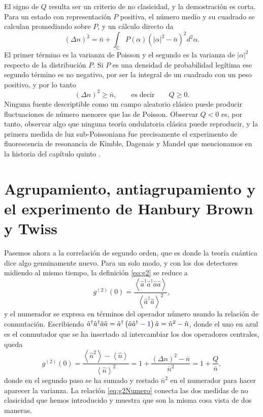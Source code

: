     El signo de $Q$ resulta ser un criterio de no clasicidad, y la demostración es corta. Para un estado con representación $P$ positiva, el número medio y su cuadrado se calculan promediando sobre $P$, y un cálculo directo da
    \begin{equation}\label{eq:VarianzaConP}
        \left(\Delta n\right)^{2} = \bar{n} + \int_{\mathbb{C}} P(\alpha)\left(|\alpha|^{2} - \bar{n}\right)^{2}d^{2}\alpha .
    \end{equation}
    El primer término es la varianza de Poisson y el segundo es la varianza de $|\alpha|^{2}$ respecto de la distribución $P$. Si $P$ es una densidad de probabilidad legítima ese segundo término es no negativo, por ser la integral de un cuadrado con un peso positivo, y por lo tanto
    \begin{equation}\label{eq:CotaClasicaQ}
        \left(\Delta n\right)^{2} \geq \bar{n},
        \qquad\text{es decir}\qquad
        Q \geq 0 .
    \end{equation}
    Ninguna fuente descriptible como un campo aleatorio clásico puede producir fluctuaciones de número menores que las de Poisson. Observar $Q<0$ es, por tanto, observar algo que ninguna teoría ondulatoria clásica puede reproducir, y la primera medida de luz sub-Poissoniana fue precisamente el experimento de fluorescencia de resonancia de Kimble, Dagenais y Mandel que mencionamos en la historia del capítulo quinto \citep{kimble1977photon}.

\section{Agrupamiento, antiagrupamiento y el experimento de Hanbury Brown y Twiss}

    Pasemos ahora a la correlación de segundo orden, que es donde la teoría cuántica dice algo genuinamente nuevo. Para un solo modo, y con los dos detectores midiendo al mismo tiempo, la definición \eqref{eq:g2} se reduce a
    \begin{equation}\label{eq:g2UnModo}
        g^{(2)}(0) = \frac{\left\langle \hat{a}^{\dagger}\hat{a}^{\dagger}\hat{a}\hat{a}\right\rangle}{\left\langle \hat{a}^{\dagger}\hat{a}\right\rangle^{2}},
    \end{equation}
    y el numerador se expresa en términos del operador número usando la relación de conmutación. Escribiendo $\hat{a}^{\dagger}\hat{a}^{\dagger}\hat{a}\hat{a} = \hat{a}^{\dagger}\left(\hat{a}\hat{a}^{\dagger}-\textcolor{blue}{1}\right)\hat{a} = \hat{n}^{2}-\hat{n}$, donde el uno en azul es el conmutador que se ha insertado al intercambiar los dos operadores centrales, queda
    \begin{equation}\label{eq:g2Numero}
        g^{(2)}(0) = \frac{\left\langle \hat{n}^{2}\right\rangle - \left\langle \hat{n}\right\rangle}{\left\langle \hat{n}\right\rangle^{2}}
        = 1 + \frac{\left(\Delta n\right)^{2}-\bar{n}}{\bar{n}^{2}}
        = 1 + \frac{Q}{\bar{n}},
    \end{equation}
    donde en el segundo paso se ha sumado y restado $\bar{n}^{2}$ en el numerador para hacer aparecer la varianza. La relación \eqref{eq:g2Numero} conecta las dos medidas de no clasicidad que hemos introducido y muestra que son la misma cosa vista de dos maneras.

